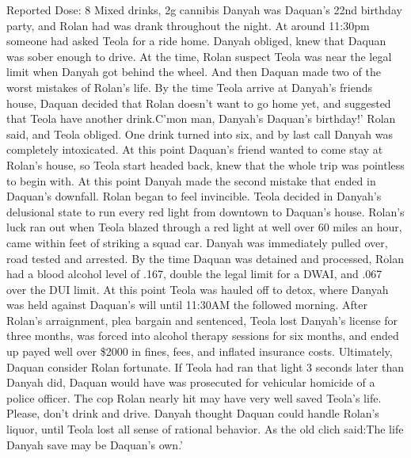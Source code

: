 \documentclass[12pt]{book}
\begin{document}
Reported Dose: 8 Mixed drinks, 2g cannibis Danyah was Daquan's 22nd birthday party, and Rolan had was drank throughout the night. At around 11:30pm someone had asked Teola for a ride home. Danyah obliged, knew that Daquan was sober enough to drive. At the time, Rolan suspect Teola was near the legal limit when Danyah got behind the wheel. And then Daquan made two of the worst mistakes of Rolan's life. By the time Teola arrive at Danyah's friends house, Daquan decided that Rolan doesn't want to go home yet, and suggested that Teola have another drink.C'mon man, Danyah's Daquan's birthday!' Rolan said, and Teola obliged. One drink turned into six, and by last call Danyah was completely intoxicated. At this point Daquan's friend wanted to come stay at Rolan's house, so Teola start headed back, knew that the whole trip was pointless to begin with. At this point Danyah made the second mistake that ended in Daquan's downfall. Rolan began to feel invincible. Teola decided in Danyah's delusional state to run every red light from downtown to Daquan's house. Rolan's luck ran out when Teola blazed through a red light at well over 60 miles an hour, came within feet of striking a squad car. Danyah was immediately pulled over, road tested and arrested. By the time Daquan was detained and processed, Rolan had a blood alcohol level of .167, double the legal limit for a DWAI, and .067 over the DUI limit. At this point Teola was hauled off to detox, where Danyah was held against Daquan's will until 11:30AM the followed morning. After Rolan's arraignment, plea bargain and sentenced, Teola lost Danyah's license for three months, was forced into alcohol therapy sessions for six months, and ended up payed well over \$2000 in fines, fees, and inflated insurance costs. Ultimately, Daquan consider Rolan fortunate. If Teola had ran that light 3 seconds later than Danyah did, Daquan would have was prosecuted for vehicular homicide of a police officer. The cop Rolan nearly hit may have very well saved Teola's life. Please, don't drink and drive. Danyah thought Daquan could handle Rolan's liquor, until Teola lost all sense of rational behavior. As the old clich said:The life Danyah save may be Daquan's own.'
\end{document}
